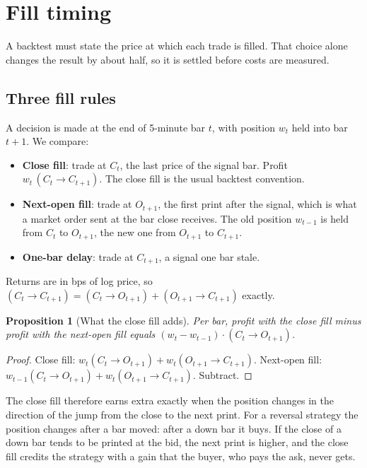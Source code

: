 \documentclass[11pt,a4paper]{article}
\newtheorem{proposition}{Proposition}
\begin{document}
\section{Fill timing}
\label{sec:fill}

A backtest must state the price at which each trade is filled. That choice alone changes the result by about half, so it is settled before costs are measured.


\subsection{Three fill rules}

A decision is made at the end of 5-minute bar $t$, with position $w_t$ held into bar $t+1$. We compare:
\begin{itemize}
\item \textbf{Close fill}: trade at $C_t$, the last price of the signal bar. Profit $w_t\,(C_t\to C_{t+1})$. The close fill is the usual backtest convention.
\item \textbf{Next-open fill}: trade at $O_{t+1}$, the first print after the signal, which is what a market
order sent at the bar close receives. The old position $w_{t-1}$ is held from $C_t$ to $O_{t+1}$, the new
one from $O_{t+1}$ to $C_{t+1}$.
\item \textbf{One-bar delay}: trade at $C_{t+1}$, a signal one bar stale.
\end{itemize}
Returns are in bps of log price, so $(C_t\to C_{t+1}) = (C_t\to O_{t+1}) + (O_{t+1}\to C_{t+1})$ exactly.

\begin{proposition}[What the close fill adds]
\label{prop:fill}
Per bar, profit with the close fill minus profit with the next-open fill equals
$(w_t-w_{t-1})\cdot(C_t\to O_{t+1})$.
\end{proposition}
\begin{proof}
Close fill: $w_t(C_t\to O_{t+1}) + w_t(O_{t+1}\to C_{t+1})$. Next-open fill:
$w_{t-1}(C_t\to O_{t+1}) + w_t(O_{t+1}\to C_{t+1})$. Subtract.
\end{proof}

The close fill therefore earns extra exactly when the position changes in the direction of the jump
from the close to the next print. For a reversal strategy the position changes after a bar moved: after a
down bar it buys. If the close of a down bar tends to be printed at the bid, the next print is higher,
and the close fill credits the strategy with a gain that the buyer, who pays the ask, never gets.
\end{document}

